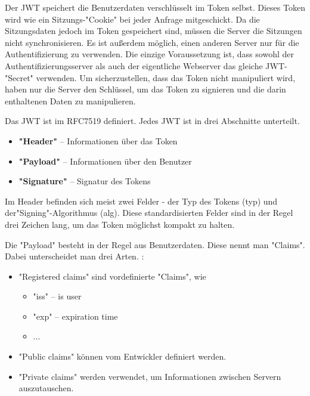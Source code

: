 \label{sec:jwt}

Der JWT speichert die Benutzerdaten verschlüsselt im Token selbst. Dieses Token wird wie ein Sitzungs-"Cookie" bei jeder Anfrage mitgeschickt. 
Da die Sitzungsdaten jedoch im Token gespeichert sind, müssen die Server die Sitzungen nicht synchronisieren. 
Es ist außerdem möglich, einen anderen Server nur für die Authentifizierung zu verwenden. 
Die einzige Voraussetzung ist, dass sowohl der Authentifizierungsserver als auch der eigentliche Webserver das gleiche JWT-"Secret" verwenden. 
Um sicherzustellen, dass das Token nicht manipuliert wird, haben nur die Server den Schlüssel, um das Token zu signieren und die darin enthaltenen Daten zu manipulieren. \cite{Auth0JWT}

Das JWT ist im RFC7519 definiert. Jedes JWT ist in drei Abschnitte\cite{Auth0JWT} unterteilt. 

\begin{itemize}
    \item \textbf{"Header"} -- Informationen über das Token
    \item \textbf{"Payload"} -- Informationen über den Benutzer
    \item \textbf{"Signature"} -- Signatur des Tokens
\end{itemize}

Im Header befinden sich meist zwei Felder - der Typ des Tokens ({\ttfamily typ}) und der\linebreak"Signing"-Algorithmus ({\ttfamily alg}). 
Diese standardisierten Felder sind in der Regel drei Zeichen lang, um das Token möglichst kompakt zu halten. \cite{Auth0JWT}

Die "Payload" besteht in der Regel aus Benutzerdaten. Diese nennt man "Claims". Dabei unterscheidet man drei Arten. \cite{Auth0JWT}: 

\begin{itemize}
    \item "Registered claims" sind vordefinierte "Claims", wie
    \begin{itemize}
        \item "iss" -- is user
        \item "exp" --  expiration time
        \item ...
    \end{itemize}
    \item "Public claims" können vom Entwickler definiert werden.
    \item "Private claims" werden verwendet, um Informationen zwischen Servern aus\-zu\-tauschen.
\end{itemize}

